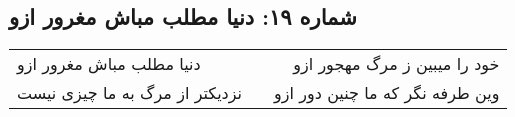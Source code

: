 \begin{center}
\section*{شماره ۱۹: دنیا مطلب مباش مغرور ازو}
\label{sec:019}
\begin{longtable}{l p{0.5cm} r}
دنیا مطلب مباش مغرور ازو
&&
خود را میبین ز مرگ مهجور ازو
\\
نزدیکتر از مرگ به ما چیزی نیست
&&
وین طرفه نگر که ما چنین دور ازو
\\
\end{longtable}
\end{center}
